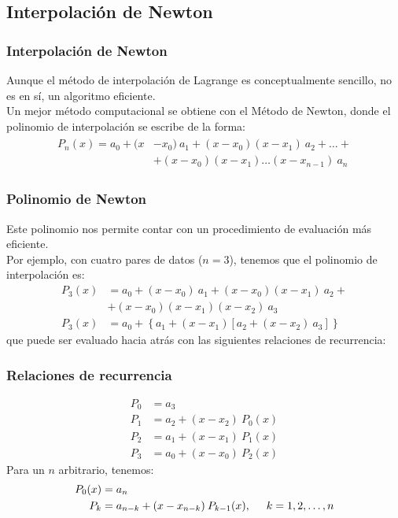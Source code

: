 \subsection{Interpolación de Newton}
\begin{frame}
\frametitle{Interpolación de Newton}
Aunque el método de interpolación de Lagrange es conceptualmente sencillo, no es en sí, un algoritmo eficiente.
\\
\medskip
\pause
Un mejor método computacional se obtiene con el Método de Newton, donde el polinomio de interpolación se escribe de la forma:
\begin{align*}
\begin{aligned}
P_{n}(x) = a_{0} + (x &- x_{0}) \: a_{1} + (x - x_{0})(x-x_{1}) \: a_{2} + \ldots + \\
&+ (x - x_{0})(x - x_{1}) \ldots (x - x_{n - 1}) \: a_{n} 
\end{aligned}
\end{align*}
\end{frame}
\begin{frame}
\frametitle{Polinomio de Newton}
Este polinomio nos permite contar con un procedimiento de evaluación más eficiente.
\\
\medskip
Por ejemplo, con cuatro pares de datos ($n = 3$), tenemos que el polinomio de interpolación es:
\begin{align*}
P_{3}(x) &= a_{0} + (x - x_{0}) \: a_{1} + (x - x_{0})(x - x_{1}) \: a_{2} + \\		
&+ (x - x_{0})(x - x_{1})(x - x_{2}) \: a_{3} \\
P_{3}(x) &= a_{0} + \left\lbrace a_{1} + (x - x_{1}) \left[a_{2} + (x - x_{2}) \: a_{3} \right] \right\rbrace 
\end{align*}
que puede ser evaluado hacia atrás con las siguientes relaciones de recurrencia:
\end{frame}
\begin{frame}[fragile]
\frametitle{Relaciones de recurrencia}
\begin{align*}
P_{0} &= a_{3} \\
P_{1} &= a_{2} + (x - x_{2}) \: P_{0}(x) \\
P_{2} &= a_{1} + (x - x_{1}) \: P_{1}(x) \\
P_{3} &= a_{0} + (x - x_{0}) \: P_{2}(x) 
\end{align*}
\pause
Para un $n$ arbitrario, tenemos:
\pause
\begin{align*}
P_{0}(x) &= a_{n} \\
P_{k} &= a_{n - k} + (x - x_{ n - k}) \: P_{k - 1}(x), \hspace{0.5cm} k = 1, 2, \ldots, n
\end{align*}
\end{frame}
